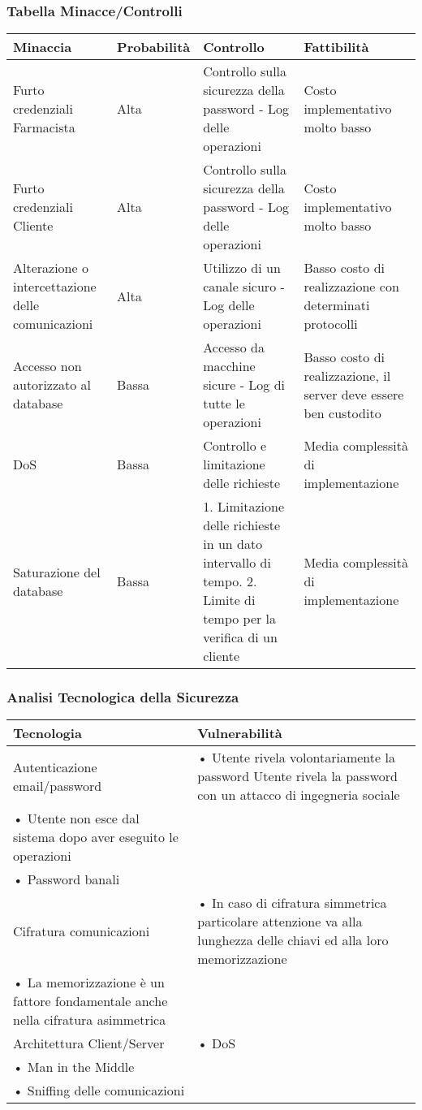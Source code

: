 \subsubsection{Tabella Minacce/Controlli}

\begin{tabular} {|P{3.5cm}|P{2.5cm}|P{6cm}|P{5cm}|}
\hline
  \textbf{Minaccia} & \textbf{Probabilità} & \textbf{Controllo} & \textbf{Fattibilità}\\
\hline
  Furto credenziali Farmacista & Alta & Controllo sulla sicurezza della password - Log delle operazioni & Costo implementativo molto basso\\
\hline
  Furto credenziali Cliente & Alta & Controllo sulla sicurezza della password - Log delle operazioni & Costo implementativo molto basso\\
\hline
  Alterazione o intercettazione delle comunicazioni & Alta & Utilizzo di un canale sicuro - Log delle operazioni & Basso costo di realizzazione con determinati protocolli\\
\hline
  Accesso non autorizzato al database & Bassa & Accesso da macchine sicure - Log di tutte le operazioni & Basso costo di realizzazione, il server deve essere ben custodito\\
\hline
  DoS & Bassa & Controllo e limitazione delle richieste & Media complessità di implementazione\\
\hline
  Saturazione del database & Bassa & 1. Limitazione delle richieste in un dato intervallo di tempo. 2. Limite di tempo per la verifica di un cliente & Media complessità di implementazione\\
\hline
\end{tabular}

\subsubsection{Analisi Tecnologica della Sicurezza}

\begin{tabular} {|P{4cm}|P{13cm}|}
\hline
  Tecnologia & Vulnerabilità\\
\hline
  Autenticazione email/password & • Utente rivela volontariamente la password Utente rivela la password con un attacco di ingegneria sociale \\ • Utente non esce dal sistema dopo aver eseguito le operazioni \\ • Password banali\\
\hline
  Cifratura comunicazioni & • In caso di cifratura simmetrica particolare attenzione va alla lunghezza delle chiavi ed alla loro memorizzazione \\ • La memorizzazione è un fattore fondamentale anche nella cifratura asimmetrica\\
\hline
  Architettura Client/Server & • DoS \\ • Man in the Middle \\ • Sniffing delle comunicazioni\\
\hline
\end{tabular}

